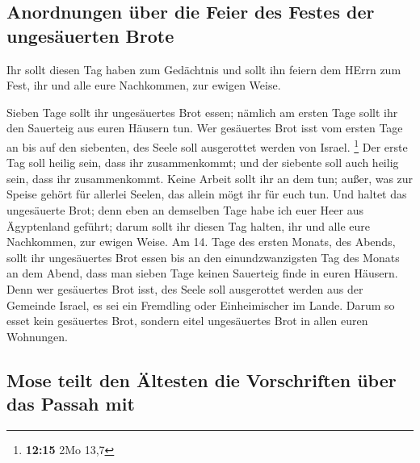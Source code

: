 \hypertarget{anordnungen-uxfcber-die-feier-des-festes-der-ungesuxe4uerten-brote}{%
\subsection{Anordnungen über die Feier des Festes der ungesäuerten
Brote}\label{anordnungen-uxfcber-die-feier-des-festes-der-ungesuxe4uerten-brote}}

 Ihr sollt diesen Tag haben zum Gedächtnis und sollt ihn
feiern dem HErrn zum Fest, ihr und alle eure Nachkommen, zur ewigen
Weise.

 Sieben Tage sollt ihr ungesäuertes Brot essen; nämlich
am ersten Tage sollt ihr den Sauerteig aus euren Häusern tun. Wer
gesäuertes Brot isst vom ersten Tage an bis auf den siebenten, des Seele
soll ausgerottet werden von Israel. \footnote{\textbf{12:15} 2Mo 13,7}
 Der erste Tag soll heilig sein, dass ihr zusammenkommt;
und der siebente soll auch heilig sein, dass ihr zusammenkommt. Keine
Arbeit sollt ihr an dem tun; außer, was zur Speise gehört für allerlei
Seelen, das allein mögt ihr für euch tun.  Und haltet das
ungesäuerte Brot; denn eben an demselben Tage habe ich euer Heer aus
Ägyptenland geführt; darum sollt ihr diesen Tag halten, ihr und alle
eure Nachkommen, zur ewigen Weise.  Am 14. Tage des
ersten Monats, des Abends, sollt ihr ungesäuertes Brot essen bis an den
einundzwanzigsten Tag des Monats an dem Abend,  dass man
sieben Tage keinen Sauerteig finde in euren Häusern. Denn wer gesäuertes
Brot isst, des Seele soll ausgerottet werden aus der Gemeinde Israel, es
sei ein Fremdling oder Einheimischer im Lande.  Darum so
esset kein gesäuertes Brot, sondern eitel ungesäuertes Brot in allen
euren Wohnungen.

\hypertarget{mose-teilt-den-uxe4ltesten-die-vorschriften-uxfcber-das-passah-mit}{%
\subsection{Mose teilt den Ältesten die Vorschriften über das Passah
mit}\label{mose-teilt-den-uxe4ltesten-die-vorschriften-uxfcber-das-passah-mit}}

